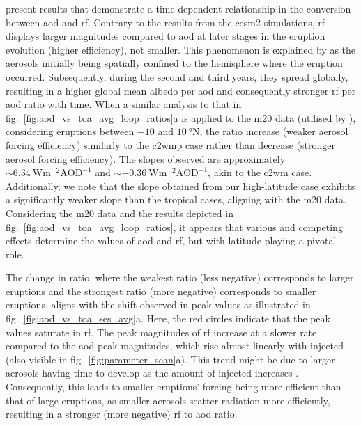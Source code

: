 \documentclass{ametsocV6.1}
\newcommand{\iso}[1][i]{{#1}njected \ce{SO2}}
\begin{document}
\citet[][their Fig.\ 1c,d]{marshall2020} present results that demonstrate a
time-dependent relationship in the conversion between \gls{aod} and \gls{rf}. Contrary
to the results from the \gls{cesm2} simulations, \gls{rf} displays larger magnitudes
compared to \gls{aod} at later stages in the eruption evolution (higher efficiency), not
smaller. This phenomenon is explained by \citet{marshall2020} as the aerosols initially
being spatially confined to the hemisphere where the eruption occurred. Subsequently,
during the second and third years, they spread globally, resulting in a higher global
mean albedo per \gls{aod} and consequently stronger \gls{rf} per \gls{aod} ratio with
time. When a similar analysis to that in fig.~\ref{fig:aod_vs_toa_avg_loop_ratios}a is
applied to the \gls{m20} data (utilised by \citet{marshall2020}), considering eruptions
between \(-10\) and \(\SI{10}{\degree\mathrm{N}}\), the ratio increase (weaker aerosol
forcing efficiency) similarly to the \gls{c2wmp} case rather than decrease (stronger
aerosol forcing efficiency). The slopes observed are approximately
\(\sim\SI{6.34}{\watt\metre^{-2}\mathrm{AOD}^{-1}}\) and
\(\sim\SI{-0.36}{\watt\metre^{-2}\mathrm{AOD}^{-1}}\), akin to the \gls{c2wm} case.
Additionally, we note that the slope obtained from our high-latitude case exhibits a
significantly weaker slope than the tropical cases, aligning with the \gls{m20} data.
Considering the \gls{m20} data and the results depicted in
fig.~\ref{fig:aod_vs_toa_avg_loop_ratios}, it appears that various and competing effects
determine the values of \gls{aod} and \gls{rf}, but with latitude playing a pivotal
role.

The change in ratio, where the weakest ratio (less negative) corresponds to larger
eruptions and the strongest ratio (more negative) corresponds to smaller eruptions,
aligns with the shift observed in peak values as illustrated in
fig.~\ref{fig:aod_vs_toa_ses_avg}a. Here, the red circles indicate that the peak values
saturate in \gls{rf}. The peak magnitudes of \gls{rf} increase at a slower rate compared
to the \gls{aod} peak magnitudes, which rise almost linearly with \iso{} (also visible
in fig.~\ref{fig:parameter_scan}a). This trend might be due to larger aerosols having
time to develop as the amount of \iso{} increases \citep{niemeier2015,marshall2019}.
Consequently, this leads to smaller eruptions' forcing being more efficient than that of
large eruptions, as smaller aerosols scatter radiation more efficiently, resulting in a
stronger (more negative) \gls{rf} to \gls{aod} ratio.
\end{document}

